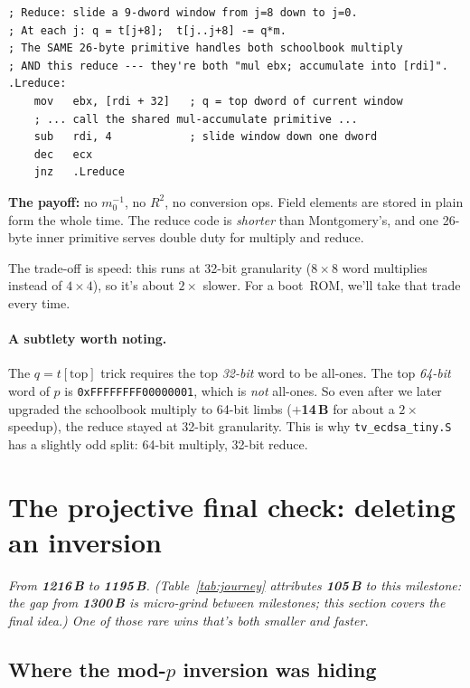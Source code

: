 \documentclass[11pt,a4paper]{article}
\newcommand{\bytes}[1]{\textcolor{blue!60!black}{\textbf{#1\,B}}}
\newcommand{\spent}[1]{\textcolor{red!70!black}{\textbf{$+$#1\,B}}}
\begin{document}
\begin{lstlisting}[language={[x86masm]Assembler}]
; Reduce: slide a 9-dword window from j=8 down to j=0.
; At each j: q = t[j+8];  t[j..j+8] -= q*m.
; The SAME 26-byte primitive handles both schoolbook multiply
; AND this reduce --- they're both "mul ebx; accumulate into [rdi]".
.Lreduce:
    mov   ebx, [rdi + 32]   ; q = top dword of current window
    ; ... call the shared mul-accumulate primitive ...
    sub   rdi, 4            ; slide window down one dword
    dec   ecx
    jnz   .Lreduce
\end{lstlisting}

\textbf{The payoff:} no $m_0^{-1}$, no $R^2$, no conversion ops.
Field elements are stored in plain form the whole time. The reduce
code is \emph{shorter} than Montgomery's, and one 26-byte inner
primitive serves double duty for multiply and reduce.

The trade-off is speed: this runs at 32-bit granularity ($8 \times 8$
word multiplies instead of $4 \times 4$), so it's about $2\times$
slower. For a boot~ROM, we'll take that trade every time.

\paragraph{A subtlety worth noting.} The $q = t[\text{top}]$ trick
requires the top \emph{32-bit} word to be all-ones. The top
\emph{64-bit} word of $p$ is \texttt{0xFFFFFFFF00000001}, which is
\emph{not} all-ones. So even after we later upgraded the schoolbook
multiply to 64-bit limbs (\spent{14} for about a $2\times$ speedup),
the reduce stayed at 32-bit granularity. This is why
\texttt{tv\_ecdsa\_tiny.S} has a slightly odd split: 64-bit multiply,
32-bit reduce.

\section{The projective final check: deleting an inversion}
\label{sec:projcheck}

\noindent\emph{From \bytes{1216} to \bytes{1195}. (Table~\ref{tab:journey}
attributes \bytes{105} to this milestone: the gap from \bytes{1300} is
micro-grind between milestones; this section covers the final idea.)
One of those rare wins that's both smaller and faster.}

\subsection{Where the mod-$p$ inversion was hiding}
\end{document}
